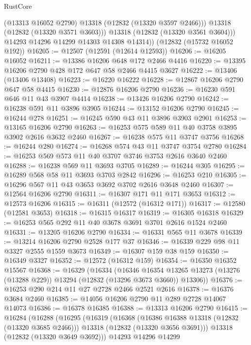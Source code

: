 \begin{lexlean}{RustCore}
\begin{coremodule}
              (@13313 @16052 @2790)
              @13318
              (@12832 (@13320 @3597 @2466)))
            @13318
            (@12832 (@13320 @3571 @3603)))
          @13318
          (@12832 (@13320 @3561 @3604)))
        @14293
        @14296
        @14299
        @14303
        @14308
        @14314))
    (@12832 (@15732 @16052 @192))
@16205 := @12507 (@12591 (@12614 @12593))
@16206 := @16205 @16052
@16211 := @13386 @16206 @648 @172 @2466 @4416
@16220 := @13395 @16206 @2790 @428 @172 @647 @58 @2466 @4415 @3627
@16222 := @13406 (@13406 @13408)
@16223 := @16220 @16222
@16228 := @12867 @16206 @2790 @647 @58 @4415
@16230 := @12876 @16206 @2790
@16236 := @16230 @591 @646 @11 @43 @3907 @4414
@16238 := @13426 @16206 @2790
@16242 := @16238 @591 @11 @3896 @3905
@16244 := @13152 @16206 @2790
@16245 := @16244 @278
@16251 := @16245 @590 @43 @11 @3896 @3903 @2901
@16253 := @13165 @16206 @2790
@16263 := @16253 @575 @589 @11 @40 @3758 @3895 @3902 @2616 @3632 @2460
@16267 := @16238 @575 @11 @3747 @3756
@16268 := @16244 @280
@16274 := @16268 @574 @43 @11 @3747 @3754 @2780
@16284 := @16253 @569 @573 @11 @40 @3707 @3746 @3753 @2616 @3640 @2460
@16288 := @16238 @569 @11 @3693 @3705
@16289 := @16244 @305
@16295 := @16289 @568 @58 @11 @3693 @3703 @2842
@16296 := @16253 @210
@16305 := @16296 @567 @11 @43 @3653 @3692 @3702 @2616 @3648 @2460
@16307 := @12564 @16206 @2790
@16311 := @16307 @171 @11 @171 @3653
@16312 := @12573 @16206
@16315 := @16311 (@12572 (@16312 @171))
@16317 := @12580 (@12581 @3653)
@16318 := @16315 @16317
@16319 := @16305 @16318
@16329 := @16253 @565 @292 @11 @40 @3678 @3691 @3701 @2616 @1524 @2460
@16331 := @13205 @16206 @2790
@16334 := @16331 @565 @11 @3678
@16339 := @13214 @16206 @2790 @2528 @177 @37
@16346 := @16339 @229 @98 @11 @3327 @2555 @1559 @3673
@16349 := @16307 @159 @38 @159
@16350 := @16349 @3327
@16352 := @12572 (@16312 @159)
@16354 := @16350 @16352 @15567
@16368 := @16329
    (@16334
      (@16346
        @16354
        @13265
        @13273
        (@13276 (@13288 @229))
        @13294
        (@12832 (@13296 @3673 @3660))
        @13306))
@16376 := @16253 @290 @214 @11 @27 @2728 @2466 @2521 @2616
@16378 := @16376 @3684 @2460
@16385 := @14056 @16206 @2790 @11 @289 @2728 @14067 @14073
@16386 := @16378 @16385
@16388 := @13313 @16206 @2790
@16415 := @16284
    (@16288
      (@16295
        (@16319
          (@16368
            (@16386 @16388 @13318 (@12832 (@13320 @3685 @2466)))
            @13318
            (@12832 (@13320 @3656 @3691)))
          @13318
          (@12832 (@13320 @3649 @3692)))
        @14293
        @14296
        @14299

\end{coremodule}
\end{lexlean}
